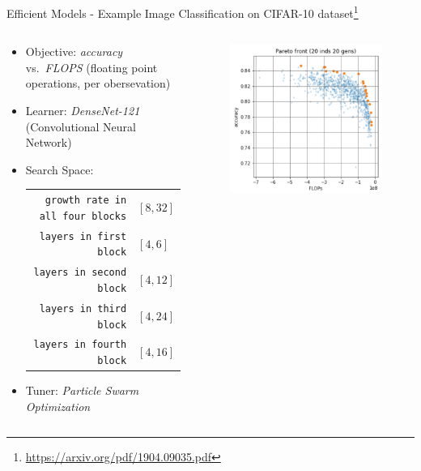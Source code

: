 \begin{frame}{Efficient Models - Example}
Image Classification on CIFAR-10 dataset\footnote{\url{https://arxiv.org/pdf/1904.09035.pdf}}
  \begin{columns}
  \begin{column}{0.65\textwidth}
    \begin{itemize}
      \item Objective: \emph{accuracy} vs.\ \emph{FLOPS} (floating point operations, per obersevation) 
      \item Learner: \emph{DenseNet-121} (Convolutional Neural Network)
      \item Search Space:\\
        \begin{tabular}{rl}
          \texttt{growth rate in all four blocks} & $[8,32]$ \\
          \texttt{layers in first block} & $[4, 6]$ \\
          \texttt{layers in second block} & $[4, 12] $ \\
          \texttt{layers in third block} & $[4, 24] $ \\
          \texttt{layers in fourth block} & $[4, 16] $ \\
        \end{tabular}
      \item Tuner: \emph{Particle Swarm Optimization}
    \end{itemize}
  \end{column}%
  \begin{column}{0.35\textwidth}
    \begin{figure}
    \includegraphics[width=\textwidth]{images/Wang_et_al_2019_Evolving_Deep_Neural_Networks_fig7_1.png}
    \end{figure}
  \end{column}
  \end{columns}

      
\end{frame}

